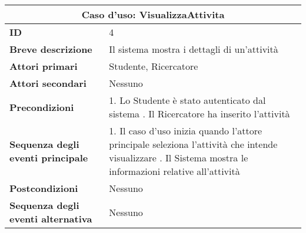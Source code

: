 \documentclass[11pt,a4paper]{report}
\begin{document}
\begin{table}[h!]
\centering
\renewcommand{\arraystretch}{1.3}
\begin{tabular}{|p{4.2cm}|p{10.2cm}|}
\hline
\multicolumn{2}{|c|}{\textbf{Caso d’uso: VisualizzaAttivita}} \\ \hline
\textbf{ID} & 4 \\ \hline
\textbf{Breve descrizione} & Il sistema mostra i dettagli di un'attività \\ \hline
\textbf{Attori primari} & Studente, Ricercatore \\ \hline
\textbf{Attori secondari} & Nessuno \\ \hline
\textbf{Precondizioni} &
1. Lo Studente è stato autenticato dal sistema \newline
2. Il Ricercatore ha inserito l'attività \\ \hline
\textbf{Sequenza degli eventi principale} &
1. Il caso d’uso inizia quando l'attore principale seleziona l'attività che intende visualizzare \newline
2. Il Sistema mostra le informazioni relative all'attività \\ \hline
\textbf{Postcondizioni} & Nessuno \\ \hline
\textbf{Sequenza degli eventi alternativa} & Nessuno \\ \hline
\end{tabular}
\end{table}

\newpage

\end{document}
